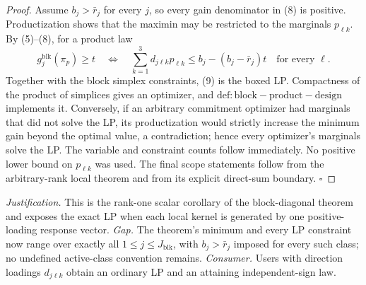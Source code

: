 \documentclass{article}
\begin{document}
\begin{proof}
Assume \(b_j>\bar r_j\) for every \(j\), so every gain denominator in (8) is positive.  Productization shows that the maximin may be restricted to the marginals \(p_{\ell k}\).  By (5)--(8), for a product law
\[
g_j^{\mathrm{blk}}(\pi_p)\ge t
\quad\Longleftrightarrow\quad
\sum_{k=1}^3d_{j\ell k}p_{\ell k}
\le b_j-(b_j-\bar r_j)t
\quad\text{for every }\ell. \tag{9}
\]
Together with the block simplex constraints, (9) is the boxed LP.  Compactness of the product of simplices gives an optimizer, and \(\mathrm{def:block-product-design}\) implements it.  Conversely, if an arbitrary commitment optimizer had marginals that did not solve the LP, its productization would strictly increase the minimum gain beyond the optimal value, a contradiction; hence every optimizer's marginals solve the LP.  The variable and constraint counts follow immediately.  No positive lower bound on \(p_{\ell k}\) was used.  The final scope statements follow from the arbitrary-rank local theorem and from its explicit direct-sum boundary. \(\square\)
\end{proof}
\par\smallskip\noindent \textit{Justification.} This is the rank-one scalar corollary of the block-diagonal theorem and exposes the exact LP when each local kernel is generated by one positive-loading response vector. \textit{Gap.} The theorem's minimum and every LP constraint now range over exactly all \(1\le j\le J_{\mathrm{blk}}\), with \(b_j>\bar r_j\) imposed for every such class; no undefined active-class convention remains. \textit{Consumer.} Users with direction loadings \(d_{j\ell k}\) obtain an ordinary LP and an attaining independent-sign law.
\end{document}
